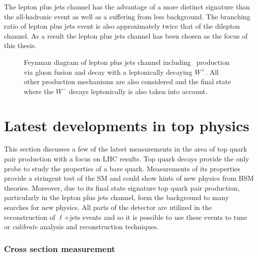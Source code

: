 The lepton plus jets channel has the advantage of a more distinct signature than the all-hadronic event as well as a suffering from less background. The branching ratio of lepton plus jets event is also approximately twice that of the dilepton channel. As a result the lepton plus jets channel has been chosen as the focus of this thesis.

\begin{figure}[htbp]
  \centering
  \begin{minipage}[][][t]{.60\textwidth}
  
  \end{minipage}
  \caption[Feynman diagram of lepton plus jets channel including \ttbar\ production via gluon fusion and decay with a leptonically decaying $W^{+}$.]{Feynman diagram of lepton plus jets channel including \ttbar\ production via gluon fusion and decay with a leptonically decaying $W^{+}$. All other production mechanisms are also considered and the final state where the $W^-$ decays leptonically is also taken into account.}\label{fig:TopQuarkFullLPlusJets}
\end{figure}

\section{Latest developments in top physics}

This section discusses a few of the latest measurements in the area of top quark pair production with a focus on LHC results. Top quark decays provide the only probe to study the properties of a bare quark. Measurements of its properties provide a stringent test of the SM and could show hints of new physics from BSM theories. Moreover, due to its final state signature top quark pair production, particularly in the lepton plus jets channel, form the background to many searches for new physics.  All parts of the detector are utilized in the reconstruction of $\ell$+jets events and so it is possible to use these events to tune or \textit{calibrate} analysis and reconstruction techniques.

\subsubsection{Cross section measurement}

